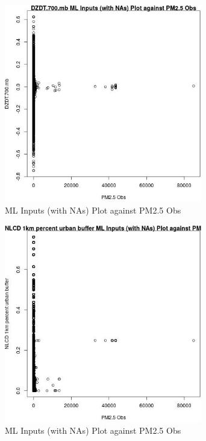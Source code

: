 \begin{figure} 
\centering  
\includegraphics[width=0.77\textwidth]{Code_Outputs/Report_ML_input_PM25_Step4_part_f_de_duplicated_aves_prioritize_24hr_obswNAs_DZDT700mbvPM25_Obs.jpg} 
\caption{\label{fig:Report_ML_input_PM25_Step4_part_f_de_duplicated_aves_prioritize_24hr_obswNAsDZDT700mbvPM25_Obs}ML Inputs (with NAs) Plot against PM2.5 Obs} 
\end{figure} 
 

\begin{figure} 
\centering  
\includegraphics[width=0.77\textwidth]{Code_Outputs/Report_ML_input_PM25_Step4_part_f_de_duplicated_aves_prioritize_24hr_obswNAs_NLCD_1km_percent_urban_buffervPM25_Obs.jpg} 
\caption{\label{fig:Report_ML_input_PM25_Step4_part_f_de_duplicated_aves_prioritize_24hr_obswNAsNLCD_1km_percent_urban_buffervPM25_Obs}ML Inputs (with NAs) Plot against PM2.5 Obs} 
\end{figure} 
 

